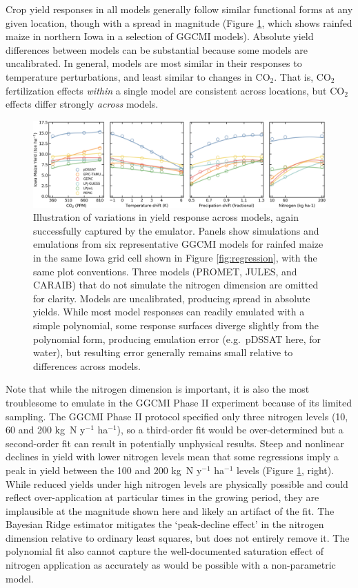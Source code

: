 \documentclass[gmdd]{copernicus} %
\begin{document}
Crop yield responses in all models generally follow similar functional forms at any given location, though with a spread in magnitude (Figure \ref{fig:regression_2}, which shows rainfed maize in northern Iowa in a selection of GGCMI models). 
Absolute yield differences between models can be substantial because some models are uncalibrated.
In general, models are most similar in their responses to temperature perturbations, and least similar to changes in CO$_2$. 
That is, CO$_2$ fertilization effects \textit{within} a single model are consistent across locations, but CO$_2$ effects differ strongly \textit{across} models. 

\begin{figure}[h!!]
\centering
    \includegraphics[width=16.3cm]{figures/regression_example_2.png}
    \caption{
    Illustration of variations in yield response across models, again successfully captured by the emulator. 
    Panels show simulations and emulations from six representative GGCMI models for rainfed maize in the same Iowa grid cell shown in Figure \ref{fig:regression}, with the same plot conventions. 
    Three models (PROMET, JULES, and CARAIB) that do not simulate the nitrogen dimension are omitted for clarity. 
    Models are uncalibrated, producing spread in absolute yields. 
    While most model responses can readily emulated with a simple polynomial, some response surfaces diverge slightly from the polynomial form, producing emulation error (e.g.\ pDSSAT here, for water), but 
    resulting error generally remains small relative to differences across models.
    }
   \label{fig:regression_2}
\end{figure}

Note that while the nitrogen dimension is important, it is also the most troublesome to emulate in the GGCMI Phase II experiment because of its limited sampling. 
The GGCMI Phase II protocol specified only three nitrogen levels (10, 60 and 200 kg~N y$^{-1}$ ha$^{-1}$), so a third-order fit would be over-determined but a second-order fit can result in potentially unphysical results. 
Steep and nonlinear declines in yield with lower nitrogen levels mean that some regressions imply a peak in yield between the 100 and 200 kg~N y$^{-1}$ ha$^{-1}$ levels (Figure \ref{fig:regression_2}, right). 
While reduced yields under high nitrogen levels are physically possible and could reflect over-application at particular times in the growing period, they are implausible at the magnitude shown here and likely an artifact of the fit. 
The Bayesian Ridge estimator mitigates the `peak-decline effect' in the nitrogen dimension relative to ordinary least squares, but does not entirely remove it. 
The polynomial fit also cannot capture the well-documented saturation effect of nitrogen application \citep[e.g.][]{Torsten77} as accurately as would be possible with a non-parametric model. 
\end{document}
